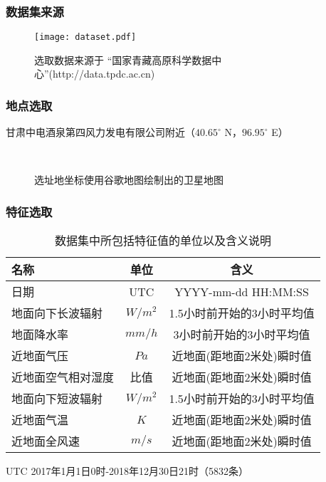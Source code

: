 \documentclass[14pt, AutoFakeBold]{ppt}
\begin{document}
\begin{frame}
  \frametitle{数据集来源}
  \begin{figure}[H]
    \centering
    \texttt{[image: dataset.pdf]}
    \caption{选取数据来源于
    “国家青藏高原科学数据中心”(http://data.tpdc.ac.cn)}
    \label{fig_dataset}
\end{figure}
\end{frame}

\begin{frame}
  \frametitle{地点选取}
  甘肃中电酒泉第四风力发电有限公司附近（$40.65^{\circ}$ N，$96.95^{\circ}$ E）
  \begin{figure}[H]
    \centering
    \\
    \caption{选址地坐标使用谷歌地图绘制出的卫星地图}
    \label{fig_google_maps}
\end{figure}
\end{frame}

\begin{frame}
  \frametitle{特征选取}
  \begin{table}[H]
    \centering
    \caption{数据集中所包括特征值的单位以及含义说明}
    \begin{tabular}{lcc}
    \toprule
    名称 & 单位 & 含义 \\
    \midrule
    日期 & UTC & YYYY-mm-dd HH:MM:SS \\
    地面向下长波辐射 & $W/m^2$ & 1.5小时前开始的3小时平均值 \\
    地面降水率 & $mm/h$ & 3小时前开始的3小时平均值 \\
    近地面气压 & $Pa$ & 近地面(距地面2米处)瞬时值 \\
    近地面空气相对湿度 & 比值 & 近地面(距地面2米处)瞬时值 \\
    地面向下短波辐射 & $W/m^2$ & 1.5小时前开始的3小时平均值 \\
    近地面气温 & $K$ & 近地面(距地面2米处)瞬时值 \\
    近地面全风速 & $m/s$ & 近地面(距地面2米处)瞬时值 \\
    \bottomrule
    \end{tabular}
    \label{features}
\end{table}
UTC 2017年1月1日0时-2018年12月30日21时（5832条）
\end{frame}
\end{document}
